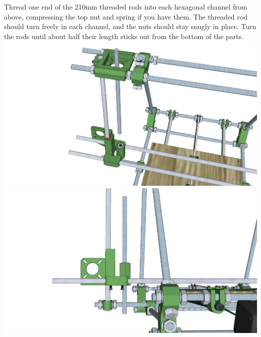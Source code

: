 \documentclass[twoside,openany,a4paper,titlepage]{memoir}
\begin{document}
	\section{}
	Thread one end of the 210mm threaded rods into each hexagonal channel from above, compressing
	the top nut and spring if you have them. The threaded rod should turn freely in each channel, and the
	nuts should stay snugly in place. Turn the rods until about half their length sticks out from the bottom of
	the parts.\\
	\includegraphics[width=1\linewidth]{graphics/ch8_18_1.png}
	\includegraphics[width=1\linewidth]{graphics/ch8_18_2.png}
	
\end{document}
